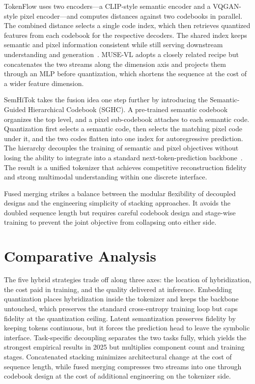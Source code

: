 \documentclass[manuscript,screen,review]{acmart}
\begin{document}
TokenFlow uses two encoders---a CLIP-style semantic encoder and a
VQGAN-style pixel encoder---and computes distances against two
codebooks in parallel. The combined distance selects a single code
index, which then retrieves quantized features from each codebook for
the respective decoders. The shared index keeps semantic and pixel
information consistent while still serving downstream understanding
and generation~\cite{qu2024tokenflow}. MUSE-VL adopts a closely related
recipe but concatenates the two streams along the dimension axis and
projects them through an MLP before quantization, which shortens the
sequence at the cost of a wider feature dimension.

SemHiTok takes the fusion idea one step further by introducing the
Semantic-Guided Hierarchical Codebook (SGHC). A pre-trained semantic
codebook organizes the top level, and a pixel sub-codebook attaches to
each semantic code. Quantization first selects a semantic code, then
selects the matching pixel code under it, and the two codes flatten
into one index for autoregressive prediction. The hierarchy decouples
the training of semantic and pixel objectives without losing the
ability to integrate into a standard next-token-prediction
backbone~\cite{chen2025semhitok}. The result is a unified tokenizer
that achieves competitive reconstruction fidelity and strong
multimodal understanding within one discrete interface.

Fused merging strikes a balance between the modular flexibility of
decoupled designs and the engineering simplicity of stacking
approaches. It avoids the doubled sequence length but requires careful
codebook design and stage-wise training to prevent the joint objective
from collapsing onto either side.

\section{Comparative Analysis}

The five hybrid strategies trade off along three axes: the location
of hybridization, the cost paid in training, and the quality
delivered at inference.
Embedding quantization places hybridization inside the tokenizer and
keeps the backbone untouched, which preserves the standard
cross-entropy training loop but caps fidelity at the quantization
ceiling. Latent semantization preserves fidelity by keeping tokens
continuous, but it forces the prediction head to leave the symbolic
interface. Task-specific decoupling separates the two tasks fully,
which yields the strongest empirical results in 2025 but multiplies
component count and training stages. Concatenated stacking minimizes
architectural change at the cost of sequence length, while fused
merging compresses two streams into one through codebook design at the
cost of additional engineering on the tokenizer side.
\end{document}
